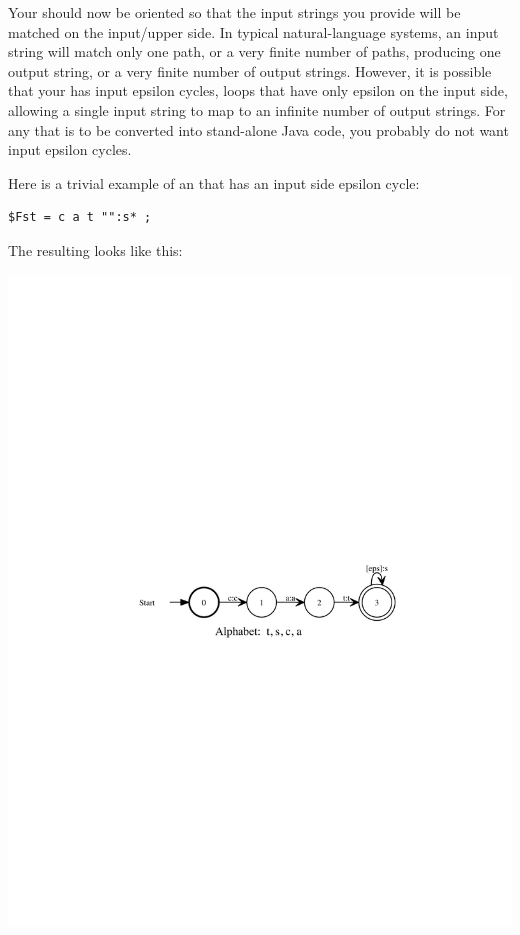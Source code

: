 Your \fsm{} should now be oriented so that the input strings you provide
will be matched on the input/upper side.  In typical natural-language
systems, an input string will match only one path, or a very finite
number of paths, producing one output string, or a very finite number of
output strings.  However, it is possible that your \fsm{} has input
epsilon cycles, loops that have only epsilon on the input side,
allowing a single input string to map to an infinite number of output strings.  
For any \fsm{} that is
to be converted into stand-alone Java code, you probably do not want
input epsilon cycles.

Here is a trivial example of an \fsm{} that has an input side epsilon cycle:

\begin{Verbatim}
$Fst = c a t "":s* ;
\end{Verbatim}

\noindent
The resulting \fsm{} looks like this:


\begin{center}
\includegraphics{images/inputepscycle.pdf}
\end{center}

